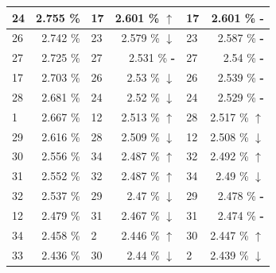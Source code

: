 \documentclass[letterpaper]{article}
\newcommand{\caseUp}[1][]{#1\textcolor[HTML]{008000}{$\mathbf{\uparrow}$}}
\newcommand{\caseStable}[1][]{#1\textcolor[HTML]{3779dd}{\textbf{-}}}
\newcommand{\caseDown}[1][]{#1\textcolor[HTML]{dd3737}{$\mathbf{\downarrow}$}}
\begin{document}
\begin{table}
\begin{tabular}{|l|r||l|r||l|r|}
	    \cellcolor[HTML]{FF4500} 24 & 2.755 \% & \cellcolor[HTML]{FF8C00} 17 & 2.601 \% \caseUp[\hfill] & \cellcolor[HTML]{FF8C00} 17 & 2.601 \% \caseStable[\hfill] \\ \hline
	    \cellcolor[HTML]{E6E6FA} 26 & 2.742 \% & \cellcolor[HTML]{FFC1C1} 23 & 2.579 \% \caseDown[\hfill] & \cellcolor[HTML]{FFC1C1} 23 & 2.587 \% \caseStable[\hfill] \\ \hline
	    \cellcolor[HTML]{FFD700} 27 & 2.725 \% & \cellcolor[HTML]{FFD700} 27 & 2.531 \% \caseStable[\hfill] & \cellcolor[HTML]{FFD700} 27 & 2.54 \% \caseStable[\hfill] \\ \hline
	    \cellcolor[HTML]{FF8C00} 17 & 2.703 \% & \cellcolor[HTML]{E6E6FA} 26 & 2.53 \%  \caseDown[\hfill] & \cellcolor[HTML]{E6E6FA} 26 & 2.539 \% \caseStable[\hfill] \\ \hline
	    \cellcolor[HTML]{FFD700} 28 & 2.681 \% & \cellcolor[HTML]{FF4500} 24 & 2.52 \%  \caseDown[\hfill] & \cellcolor[HTML]{FF4500} 24 & 2.529 \% \caseStable[\hfill] \\ \hline
	    \cellcolor[HTML]{FFFFFF}  1 & 2.667 \% & \cellcolor[HTML]{FF69B4} 12 & 2.513 \% \caseUp[\hfill] & \cellcolor[HTML]{FFD700} 28 & 2.517 \% \caseUp[\hfill] \\ \hline
	    \cellcolor[HTML]{FFFFF0} 29 & 2.616 \% & \cellcolor[HTML]{FFD700} 28 & 2.509 \% \caseDown[\hfill] & \cellcolor[HTML]{FF69B4} 12 & 2.508 \% \caseDown[\hfill] \\ \hline
	    \cellcolor[HTML]{FFD700} 30 & 2.556 \% & \cellcolor[HTML]{EEEED1} 34 & 2.487 \% \caseUp[\hfill] & \cellcolor[HTML]{2E8B57} 32 & 2.492 \% \caseUp[\hfill] \\ \hline
	    \cellcolor[HTML]{BEBEBE} 31 & 2.552 \% & \cellcolor[HTML]{2E8B57} 32 & 2.487 \% \caseUp[\hfill] & \cellcolor[HTML]{EEEED1} 34 & 2.49 \% \caseDown[\hfill] \\ \hline
	    \cellcolor[HTML]{2E8B57} 32 & 2.537 \% & \cellcolor[HTML]{FFFFF0} 29 & 2.47 \%  \caseDown[\hfill] & \cellcolor[HTML]{FFFFF0} 29 & 2.478 \% \caseStable[\hfill] \\ \hline
	    \cellcolor[HTML]{FF69B4} 12 & 2.479 \% & \cellcolor[HTML]{BEBEBE} 31 & 2.467 \% \caseDown[\hfill] & \cellcolor[HTML]{BEBEBE} 31 & 2.474 \% \caseStable[\hfill] \\ \hline
	    \cellcolor[HTML]{EEEED1} 34 & 2.458 \% & \cellcolor[HTML]{A0522D}  2 & 2.446 \% \caseUp[\hfill] & \cellcolor[HTML]{FFD700} 30 & 2.447 \% \caseUp[\hfill] \\ \hline
	    \cellcolor[HTML]{2E8B57} 33 & 2.436 \% & \cellcolor[HTML]{FFD700} 30 & 2.44 \%  \caseDown[\hfill] & \cellcolor[HTML]{A0522D} 2 & 2.439 \% \caseDown[\hfill] \\ \hline

\end{tabular}
\end{table}
\end{document}
